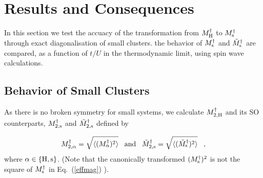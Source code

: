 \documentclass[aps,prb,twocolumn,superscriptaddress,
               amsmath]{revtex4}
\renewcommand{\=}{\,=\,}
\newcommand{\+}{\,+\,}
\renewcommand{\-}{\,-\,}
\begin{document}
\section{Results and Consequences}
In this section we test the accuacy of the transformation from $M_{\rm H}^\dagger$ to $M_{\rm s}^\dagger$ through exact diagonalisation of small clusters. the behavior of $M_{\rm s}^\dagger$ and $\tilde{M}_{\rm s}^\dagger$ are compared, as a function of $t/U$ in the thermodynamic limit, using spin wave calculations.

\subsection{Behavior of Small Clusters}

As there is no broken symmetry for small systems, we
calculate $M^\dagger_{2,{\rm H}}$ and its SO
counterparts, $M^\dagger_{2,{\rm s}}$ and
$\tilde M^\dagger_{2,{\rm s}}$ defined by


\begin{equation}
M^\dagger_{2,\alpha} =\sqrt{ \langle (M^\dagger _\alpha)^2\rangle} \;\;\;
{\rm and}
\;\;\;
\tilde M^\dagger_{2,{\rm s}} =\sqrt{ \langle (\tilde M^\dagger _{\rm s})^2\rangle}
\;\;\; ,
\end{equation}
where $\alpha \in \{ {\rm H},{\rm s} \}$. (Note that the canonically
transformed $(M^\dagger_{\rm s})^2$ is not the
square of $M^\dagger _{\rm s}$ in Eq.~(\ref{effmag}) \cite{note}).
\end{document}

